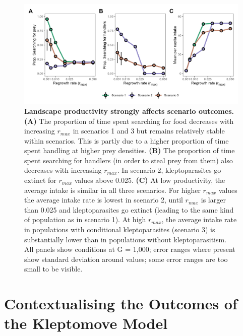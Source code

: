 \begin{figure}[t!]
    \centering
    \includegraphics[width=\textwidth]{figures/kleptomove/fig_06.png}
    \caption{
        \textbf{Landscape productivity strongly affects scenario outcomes.}
        \textbf{(A)} The proportion of time spent searching for food decreases with increasing $r_{max}$ in scenarios 1 and 3 but remains relatively stable within scenarios. 
        This is partly due to a higher proportion of time spent handling at higher prey densities. 
        \textbf{(B)} The proportion of time spent searching for handlers (in order to steal prey from them) also decreases with increasing $r_{max}$. 
        In scenario 2, kleptoparasites go extinct for $r_{max}$ values above 0.025. 
        \textbf{(C)} At low productivity, the average intake is similar in all three scenarios. 
        For higher $r_{max}$ values the average intake rate is lowest in scenario 2, until $r_{max}$ is larger than 0.025 and kleptoparasites go extinct (leading to the same kind of population as in scenario 1). 
        At high $r_{max}$, the average intake rate in populations with conditional kleptoparasites (scenario 3) is substantially lower than in populations without kleptoparasitism.
        All panels show conditions at G = 1,000; error ranges where present show standard deviation around values; some error ranges are too small to be visible.
    }
    \label{klepto_fig_06}
\end{figure}

\section*{Contextualising the Outcomes of the Kleptomove Model}

